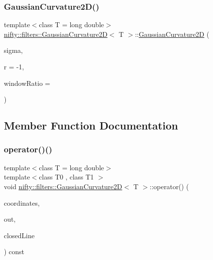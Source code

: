 \subsubsection{\texorpdfstring{Gaussian\+Curvature2\+D()}{GaussianCurvature2D()}}
{\footnotesize\ttfamily template$<$class T = long double$>$ \\
\hyperlink{classnifty_1_1filters_1_1GaussianCurvature2D}{nifty\+::filters\+::\+Gaussian\+Curvature2D}$<$ T $>$\+::\hyperlink{classnifty_1_1filters_1_1GaussianCurvature2D}{Gaussian\+Curvature2D} (\begin{DoxyParamCaption}\item[{const \hyperlink{classnifty_1_1filters_1_1GaussianCurvature2D_af2739080c97506f5e72ebd4e69652311}{Value\+Type}}]{sigma,  }\item[{int}]{r = {\ttfamily -\/1},  }\item[{const \hyperlink{classnifty_1_1filters_1_1GaussianCurvature2D_af2739080c97506f5e72ebd4e69652311}{Value\+Type}}]{window\+Ratio = {} }\end{DoxyParamCaption})\hspace{0.3cm}{\ttfamily [inline]}}



\subsection{Member Function Documentation}
\mbox{\label{classnifty_1_1filters_1_1GaussianCurvature2D_a46b578ba29e351dd59552ca1fafd11ae}} 
\subsubsection{\texorpdfstring{operator()()}{operator()()}\hspace{0.1cm}{\footnotesize\ttfamily [1/2]}}
{\footnotesize\ttfamily template$<$class T = long double$>$ \\
template$<$class T0 , class T1 $>$ \\
void \hyperlink{classnifty_1_1filters_1_1GaussianCurvature2D}{nifty\+::filters\+::\+Gaussian\+Curvature2D}$<$ T $>$\+::operator() (\begin{DoxyParamCaption}\item[{const \hyperlink{classandres_1_1View}{nifty\+::marray\+::\+View}$<$ T0 $>$ \&}]{coordinates,  }\item[{\hyperlink{classandres_1_1View}{nifty\+::marray\+::\+View}$<$ T1 $>$ \&}]{out,  }\item[{const bool}]{closed\+Line }\end{DoxyParamCaption}) const\hspace{0.3cm}{\ttfamily [inline]}}

